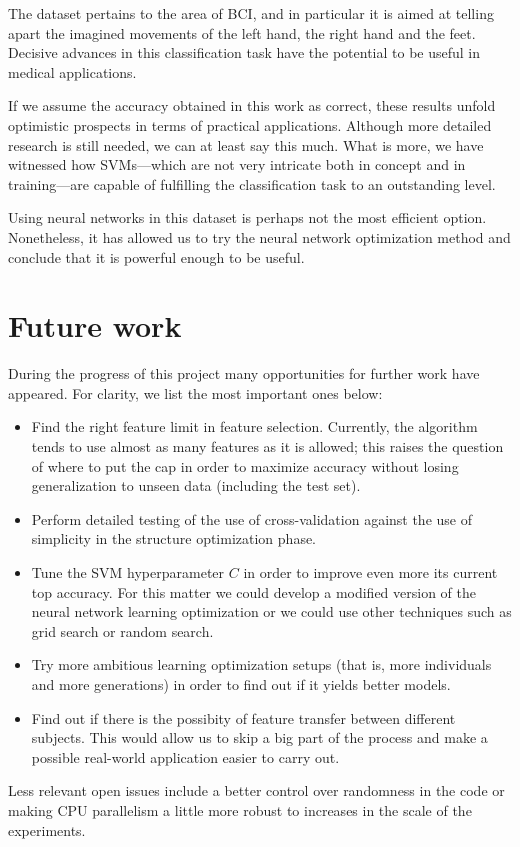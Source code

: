 		The dataset pertains to the area of \acs{BCI}, and in particular it is aimed at telling apart the imagined movements of the left hand, the right hand and the feet. Decisive advances in this classification task have the potential to be useful in medical applications.

		If we assume the accuracy obtained in this work as correct, these results unfold optimistic prospects in terms of practical applications. Although more detailed research is still needed, we can at least say this much. What is more, we have witnessed how \acs{SVM}s---which are not very intricate both in concept and in training---are capable of fulfilling the classification task to an outstanding level.

		Using neural networks in this dataset is perhaps not the most efficient option. Nonetheless, it has allowed us to try the neural network optimization method and conclude that it is powerful enough to be useful.

\section{Future work}

	During the progress of this project many opportunities for further work have appeared. For clarity, we list the most important ones below:

	\begin{itemize}

		\item
		Find the right feature limit in feature selection. Currently, the algorithm tends to use almost as many features as it is allowed; this raises the question of where to put the cap in order to maximize accuracy without losing generalization to unseen data (including the test set).

		\item
		Perform detailed testing of the use of cross-validation against the use of simplicity in the structure optimization phase.

		\item
		Tune the SVM hyperparameter $C$ in order to improve even more its current top accuracy. For this matter we could develop a modified version of the neural network learning optimization or we could use other techniques such as grid search or random search.

		\item
		Try more ambitious learning optimization setups (that is, more individuals and more generations) in order to find out if it yields better models.

		\item
		Find out if there is the possibity of feature transfer between different subjects. This would allow us to skip a big part of the process and make a possible real-world application easier to carry out.

	\end{itemize}

	Less relevant open issues include a better control over randomness in the code or making CPU parallelism a little more robust to increases in the scale of the experiments.
